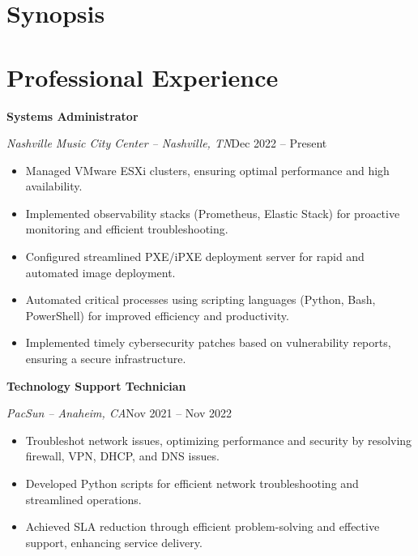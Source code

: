 \documentclass[a4paper]{article}
\begin{document}
\begin{minipage}[t]{0.62\textwidth}
    \raggedright
    \vspace*{0pt}

    \section{Synopsis}
    \begin{center}
        \appsynopsis{}
    \end{center}

    \section{Professional Experience}
    \textbf{Systems Administrator}\par
    \textit{Nashville Music City Center -- Nashville, TN}\hfill Dec 2022 -- Present
    \begin{itemize}[noitemsep,nolistsep]
        \item Managed VMware ESXi clusters, ensuring optimal performance and high availability.
        \item Implemented observability stacks (Prometheus, Elastic Stack) for proactive monitoring and efficient troubleshooting.
        \item Configured streamlined PXE/iPXE deployment server for rapid and automated image deployment.
        \item Automated critical processes using scripting languages (Python, Bash, PowerShell) for improved efficiency and productivity.
        \item Implemented timely cybersecurity patches based on vulnerability reports, ensuring a secure infrastructure.
    \end{itemize}

    \vspace{0.5em}
    \textbf{Technology Support Technician}\par
    \textit{PacSun -- Anaheim, CA}\hfill Nov 2021 -- Nov 2022
    \begin{itemize}[noitemsep,nolistsep]
        \item Troubleshot network issues, optimizing performance and security by resolving firewall, VPN, DHCP, and DNS issues.
        \item Developed Python scripts for efficient network troubleshooting and streamlined operations.
        \item Achieved SLA reduction through efficient problem-solving and effective support, enhancing service delivery.
    \end{itemize}


\end{minipage}
\end{document}
